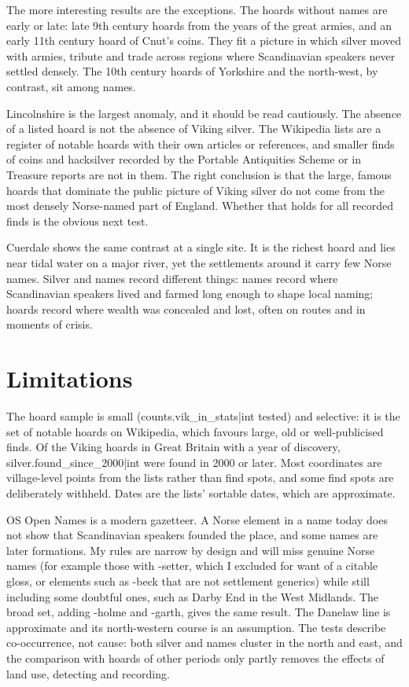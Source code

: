 \documentclass[11pt,a4paper]{article}
\begin{document}
The more interesting results are the exceptions. The hoards without names are early or late: late 9th century hoards from the years of the great armies, and an early 11th century hoard of Cnut's coins. They fit a picture in which silver moved with armies, tribute and trade across regions where Scandinavian speakers never settled densely. The 10th century hoards of Yorkshire and the north-west, by contrast, sit among names.

Lincolnshire is the largest anomaly, and it should be read cautiously. The absence of a listed hoard is not the absence of Viking silver. The Wikipedia lists are a register of notable hoards with their own articles or references, and smaller finds of coins and hacksilver recorded by the Portable Antiquities Scheme or in Treasure reports are not in them. The right conclusion is that the large, famous hoards that dominate the public picture of Viking silver do not come from the most densely Norse-named part of England. Whether that holds for all recorded finds is the obvious next test.

Cuerdale shows the same contrast at a single site. It is the richest hoard and lies near tidal water on a major river, yet the settlements around it carry few Norse names. Silver and names record different things: names record where Scandinavian speakers lived and farmed long enough to shape local naming; hoards record where wealth was concealed and lost, often on routes and in moments of crisis.

\section{Limitations}

The hoard sample is small ({{counts.vik_in_stats|int}} tested) and selective: it is the set of notable hoards on Wikipedia, which favours large, old or well-publicised finds. Of the Viking hoards in Great Britain with a year of discovery, {{silver.found_since_2000|int}} were found in 2000 or later. Most coordinates are village-level points from the lists rather than find spots, and some find spots are deliberately withheld. Dates are the lists' sortable dates, which are approximate.

OS Open Names is a modern gazetteer. A Norse element in a name today does not show that Scandinavian speakers founded the place, and some names are later formations. My rules are narrow by design and will miss genuine Norse names (for example those with -setter, which I excluded for want of a citable gloss, or elements such as -beck that are not settlement generics) while still including some doubtful ones, such as Darby End in the West Midlands. The broad set, adding -holme and -garth, gives the same result. The Danelaw line is approximate and its north-western course is an assumption. The tests describe co-occurrence, not cause: both silver and names cluster in the north and east, and the comparison with hoards of other periods only partly removes the effects of land use, detecting and recording.
\end{document}
